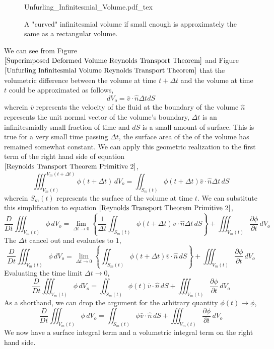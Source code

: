 \begin{figure}[H]\centering
\def\svgwidth{400px}
{Unfurling_Infinitesmial_Volume.pdf_tex}
\caption{A "curved" infinitesmial volume if small enough is approximately the same as a rectangular volume.}
\label{Unfurling Infinitesmial Volume Reynolds Transport Theorem}
\end{figure}
We can see from Figure $\ref{Superimposed Deformed Volume Reynolds Transport Theorem}$ and Figure $\ref{Unfurling Infinitesmial Volume Reynolds Transport Theorem}$ that the volumetric difference between the volume at time $t+\Delta t$ and the volume at time $t$ could be approximated as follows,
$$dV_{o} = \bar{v}\cdot \hat{n}\Delta tdS$$
wherein $\bar{v}$ represents the velocity of the fluid at the boundary of the volume $\hat{n}$ represents the unit normal vector of the volume's boundary, $\Delta t$ is an infinitesmially small fraction of time and $dS$ is a small amount of surface.
This is true for a very small time passing $\Delta t$, the surface area of the of the volume has remained somewhat constant. 
We can apply this geometric realization to the first term of the right hand side of equation $\ref{Reynolds Transport Theorem Primitive 2}$,
$$\iiint^{V_{m}(t+\Delta t)}_{V_{m}(t)} \phi(t+\Delta t) \,dV_{o} = \iint^{}_{S_{m}(t)} \phi(t+\Delta t) \bar{v}\cdot \hat{n}\Delta t\,dS$$
wherein $S_{m}(t)$ represents the surface of the volume at time $t$.
We can substitute this simplification to equation $\ref{Reynolds Transport Theorem Primitive 2}$,
$$\frac{D}{Dt}\iiint^{}_{V_{m}(t)} \phi \,dV_{o} = \lim_{\Delta t \to 0}\left\{\frac{1}{\Delta t} \iint^{}_{S_{m}(t)}\phi(t+\Delta t) \bar{v}\cdot\hat{n}\Delta t\,dS\right\} + \iiint^{}_{V_{m}(t)} \frac{\partial \phi}{\partial t} \,dV_{o}$$
The $\Delta t$ cancel out and evaluates to $1$,
$$\frac{D}{Dt}\iiint^{}_{V_{m}(t)} \phi \,dV_{o} = \lim_{\Delta t \to 0}\left\{ \iint^{}_{S_{m}(t)}\phi(t+\Delta t) \bar{v}\cdot\hat{n}\,dS\right\} + \iiint^{}_{V_{m}(t)} \frac{\partial \phi}{\partial t} \,dV_{o}$$
Evaluating the time limit $\Delta t \to 0$,
$$\frac{D}{Dt}\iiint^{}_{V_{m}(t)} \phi \,dV_{o} = \iint^{}_{S_{m}(t)}\phi(t) \bar{v}\cdot\hat{n}\,dS + \iiint^{}_{V_{m}(t)} \frac{\partial \phi}{\partial t} \,dV_{o}$$
As a shorthand, we can drop the argument for the arbitrary quantity $\phi(t) \to \phi$,
$$\frac{D}{Dt}\iiint^{}_{V_{m}(t)} \phi \,dV_{o} = \iint^{}_{S_{m}(t)}\phi \bar{v}\cdot\hat{n}\,dS + \iiint^{}_{V_{m}(t)} \frac{\partial \phi}{\partial t} \,dV_{o}$$
We now have a surface integral term and a volumetric integral term on the right hand side.
